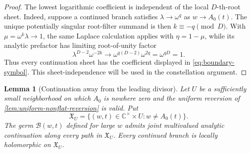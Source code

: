 \documentclass[11pt]{article}
\numberwithin{equation}{section}
\newtheorem{lemma}[lemma]{Lemma}
\theoremstyle{definition}
\theoremstyle{remark}
\newcommand{\C}{\mathbb C}
\newcommand{\Bcal}{\mathcal B}
\begin{document}
\begin{proof}
  The lowest logarithmic coefficient is independent of the local
  $D$-th-root sheet.  Indeed, suppose a continued branch satisfies
  $\lambda\to\omega^q$ as $w\to A_0(t)$.  The unique potentially singular
  root-filter summand is then $k\equiv-q\pmod D$.  With
  $\mu=\omega^k\lambda\to1$, the same Laplace calculation applies with
  $\eta=1-\mu$, while its analytic prefactor has limiting root-of-unity
  factor
  \[
    \lambda^{D-2}\omega^{-2k}
    \longrightarrow
    \omega^{q(D-2)}\omega^{2q}=\omega^{qD}=1.
  \]
  Thus every continuation sheet has the coefficient displayed in
  \eqref{eq:boundary-symbol}.  This sheet-independence will be used in the
  constellation argument.
\end{proof}

\begin{lemma}[Continuation away from the leading divisor]
\label{lem:Bcal-continuation}
Let $U$ be a sufficiently small neighborhood on which $A_0$ is nowhere
zero and the uniform reversion of \cref{lem:uniform-nonflat-reversion} is
valid.  Put
\[
  \mathfrak X_U=
  \{(w,t)\in\C^\times\times U:w\ne A_0(t)\}.
\]
The germ $\Bcal(w,t)$ defined for large $w$ admits joint multivalued analytic
continuation along every path in $\mathfrak X_U$.  Every continued branch is
locally holomorphic on $\mathfrak X_U$.
\end{lemma}
\end{document}
